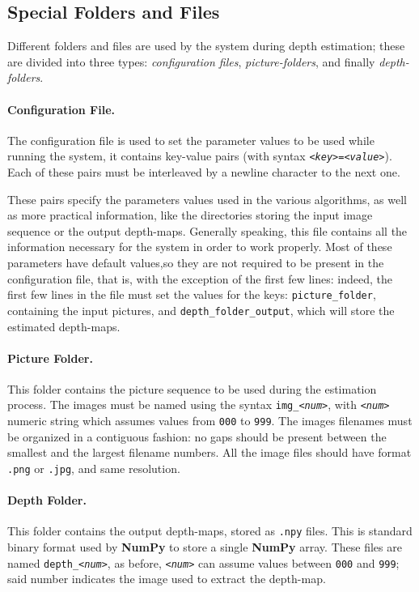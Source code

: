\documentclass[notitlepage,english]{hgbreport}
\begin{document}
\subsection{Special Folders and Files}
Different folders and files are used by the system during depth estimation; these are divided into three types: \emph{configuration files}, \emph{picture-folders}, and finally \emph{depth-folders}.

\paragraph{Configuration File.} The configuration file is used to set the parameter values to be used while running the system, it contains key-value pairs (with syntax \texttt{<\emph{key}>=<\emph{value}>}).
Each of these pairs must be interleaved by a newline character to the next one.

These pairs specify the parameters values used in the various algorithms, as well as more practical information, like the directories storing the input image sequence or the output depth-maps. Generally speaking, this file contains all the information necessary for the system in order to work properly. Most of these parameters have default values,so they are not required to be present in the configuration file, that is, with the exception of the first few lines: indeed, the first few lines in the file must set the values for the keys: \texttt{picture\_folder}, containing the input pictures, and \texttt{depth\_folder\_output}, which will store the estimated depth-maps.


\paragraph{Picture Folder.} This folder contains the picture sequence to be used during the estimation process.
The images must be named using the syntax \texttt{img\_\textit{<num>}}, with \texttt{\textit{<num>}} numeric string which assumes values from \texttt{000} to \texttt{999}. The images filenames must be organized in a contiguous fashion: no gaps should be present between the smallest and the largest filename numbers.
All the image files should have format \texttt{.png} or \texttt{.jpg}, and same resolution.


\paragraph{Depth Folder.} This folder contains the output depth-maps, stored as \texttt{.npy} files. This is standard binary format used by \textbf{NumPy} to store a single \textbf{NumPy} array. These files are named \texttt{depth\_\textit{<num>}}, as before,  \texttt{\textit{<num>}} can assume values between \texttt{000} and \texttt{999}; said number indicates the image used to extract the depth-map.
\end{document}
